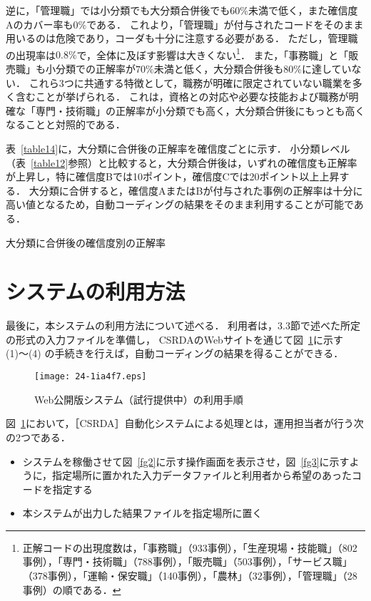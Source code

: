 \documentclass[japanese]{jnlp_1.4}
\begin{document}
逆に，「管理職」では小分類でも大分類合併後でも$60\%$未満で低く，また確信度Aのカバー率も$0\%$である．
これより，「管理職」が付与されたコードをそのまま用いるのは危険であり，コーダも十分に注意する必要がある．
ただし，管理職の出現率は$0.8\%$で，全体に及ぼす影響は大きくない\footnote{正解コードの出現度数は，「事務職」（933事例），「生産現場・技能職」（802事例），「専門・技術職」（788事例），「販売職」（503事例），「サービス職」（378事例），「運輸・保安職」（140事例），「農林」（32事例），「管理職」（28事例）の順である．}． 
また，「事務職」と「販売職」も小分類での正解率が$70\%$未満と低く，大分類合併後も$80\%$に達していない．
これら3つに共通する特徴として，職務が明確に限定されていない職業を多く含むことが挙げられる．
これは，資格との対応や必要な技能および職務が明確な「専門・技術職」の正解率が小分類でも高く，大分類合併後にもっとも高くなることと対照的である． 

表~\ref{table14}に，大分類に合併後の正解率を確信度ごとに示す．
小分類レベル（表~\ref{table12}参照）と比較すると，大分類合併後は，いずれの確信度も正解率が上昇し，特に確信度Bでは10ポイント，確信度Cでは20ポイント以上上昇する．
大分類に合併すると，確信度AまたはBが付与された事例の正解率は十分に高い値となるため，自動コーディングの結果をそのまま利用することが可能である． 

\begin{table}[t]
\caption{大分類に合併後の確信度別の正解率}
\label{table14}

\end{table}



\section{システムの利用方法} 

最後に，本システムの利用方法について述べる．
利用者は，3.3節で述べた所定の形式の入力ファイルを準備し，
CSRDAのWebサイトを通じて図~\ref{fg4}に示す (1)〜(4) の手続きを行えば，自動コーディングの結果を得ることができる．

\begin{figure}[t]
\begin{center}
\texttt{[image: 24-1ia4f7.eps]}
\end{center}
\caption{Web公開版システム（試行提供中）の利用手順}
\label{fg4}
\end{figure}

図~\ref{fg4}において，［CSRDA］自動化システムによる処理とは，運用担当者が行う次の2つである．

\begin{itemize}
 \item システムを稼働させて図~\ref{fg2}に示す操作画面を表示させ，図~\ref{fg3}に示すように，指定場所に置かれた入力データファイルと利用者から希望のあったコードを指定する
 \item 本システムが出力した結果ファイルを指定場所に置く
\end{itemize}
\end{document}

